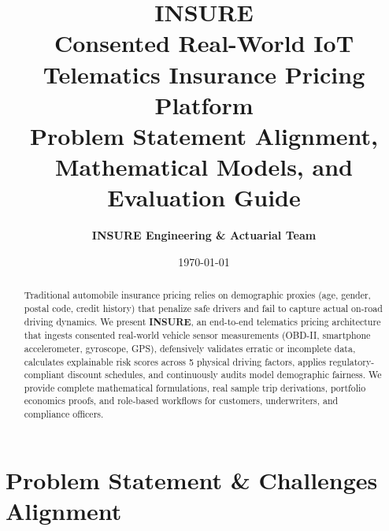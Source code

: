 \documentclass[11pt,a4paper]{article}
\title{
    \vspace{-1.5cm}
    \textbf{\Huge INSURE}\\[0.3cm]
    \Large \textbf{Consented Real-World IoT Telematics Insurance Pricing Platform}\\[0.2cm]
    \large Problem Statement Alignment, Mathematical Models, and Evaluation Guide
}
\author{\textbf{INSURE Engineering \& Actuarial Team}}
\date{\today}
\begin{document}
\maketitle
\thispagestyle{fancy}

\begin{abstract}
Traditional automobile insurance pricing relies on demographic proxies (age, gender, postal code, credit history) that penalize safe drivers and fail to capture actual on-road driving dynamics. We present \textbf{INSURE}, an end-to-end telematics pricing architecture that ingests consented real-world vehicle sensor measurements (OBD-II, smartphone accelerometer, gyroscope, GPS), defensively validates erratic or incomplete data, calculates explainable risk scores across 5 physical driving factors, applies regulatory-compliant discount schedules, and continuously audits model demographic fairness. We provide complete mathematical formulations, real sample trip derivations, portfolio economics proofs, and role-based workflows for customers, underwriters, and compliance officers.
\end{abstract}

\vspace{0.3cm}

\section{Problem Statement \& Challenges Alignment}
\end{document}
